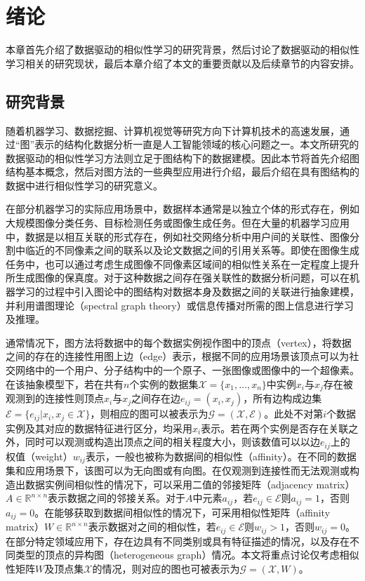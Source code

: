 \chapter{绪论}
本章首先介绍了数据驱动的相似性学习的研究背景，然后讨论了数据驱动的相似性学习相关的研究现状，最后本章介绍了本文的重要贡献以及后续章节的内容安排。
\section{研究背景}
随着机器学习、数据挖掘、计算机视觉等研究方向下计算机技术的高速发展，通过“图”\cite{chung1997spectral}表示的结构化数据分析一直是人工智能领域的核心问题之一。本文所研究的数据驱动的相似性学习方法则立足于图结构下的数据建模。因此本节将首先介绍图结构基本概念，然后对图方法的一些典型应用进行介绍，最后介绍在具有图结构的数据中进行相似性学习的研究意义。

在部分机器学习的实际应用场景中，数据样本通常是以独立个体的形式存在，例如大规模图像分类任务、目标检测任务或图像生成任务。但在大量的机器学习应用中，数据是以相互关联的形式存在，例如社交网络分析中用户间的关联性、图像分割中临近的不同像素之间的联系以及论文数据之间的引用关系等。即使在图像生成任务中，也可以通过考虑生成图像不同像素区域间的相似性关系在一定程度上提升所生成图像的保真度\cite{zhang2018self}。对于这种数据之间存在强关联性的数据分析问题，可以在机器学习的过程中引入图论中的图结构对数据本身及数据之间的关联进行抽象建模，并利用谱图理论（spectral graph theory）\cite{chung1997spectral}或信息传播对所需的图上信息进行学习及推理。

通常情况下，图方法将数据中的每个数据实例视作图中的顶点（vertex），将数据之间的存在的连接性用图上边（edge）表示，根据不同的应用场景该顶点可以为社交网络中的一个用户、分子结构中的一个原子、一张图像或图像中的一个超像素。在该抽象模型下，若在共有$n$个实例的数据集$\mathcal{X}=\{x_1,\dots,x_n\}$中实例$x_i$与$x_j$存在被观测到的连接性则顶点$x_i$与$x_j$之间存在边$e_{ij}=(x_i, x_j)$，所有边构成边集$\mathcal{E}=\{e_{ij}|x_i, x_j\in \mathcal{X}\}$，则相应的图可以被表示为$\mathcal{G} = (\mathcal{X}, \mathcal{E})$。此处不对第$i$个数据实例及其对应的数据特征进行区分，均采用$x_i$表示。若在两个实例是否存在关联之外，同时可以观测或构造出顶点之间的相关程度大小，则该数值可以以边$e_{ij}$上的权值（weight）$w_{ij}$表示，一般也被称为数据间的相似性（affinity）。在不同的数据集和应用场景下，该图可以为无向图或有向图。在仅观测到连接性而无法观测或构造出数据实例间相似性的情况下，可以采用二值的邻接矩阵（adjacency matrix）$A\in\mathbb{R}^{n\times n}$表示数据之间的邻接关系。对于$A$中元素$a_{ij}$，若$e_{ij}\in \mathcal{E}$则$a_{ij}=1$，否则$a_{ij}=0$。在能够获取到数据间相似性的情况下，可采用相似性矩阵（affinity matrix）$W\in\mathbb{R}^{n\times n}$表示数据对之间的相似性，若$e_{ij}\in \mathcal{E}$则$w_{ij}>1$，否则$w_{ij}=0$。在部分特定领域应用下，存在边具有不同类别或具有特征描述的情况，以及存在不同类型的顶点的异构图（heterogeneous graph）情况。本文将重点讨论仅考虑相似性矩阵$W$及顶点集$\mathcal{X}$的情况，则对应的图也可被表示为$\mathcal{G} = (\mathcal{X}, W)$。

